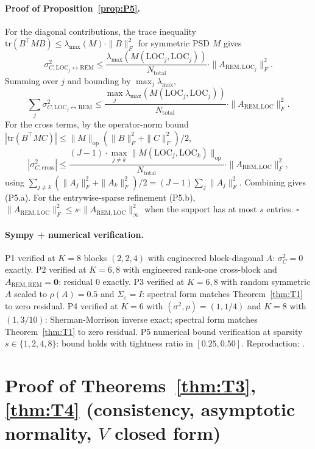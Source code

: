 \documentclass[11pt,letterpaper]{article}
\theoremstyle{remark}
\newcommand{\REM}{\mathrm{REM}}
\newcommand{\LOC}{\mathrm{LOC}}
\newcommand{\Sigmae}{\Sigma_\varepsilon}
\newcommand{\Ntot}{N_{\mathrm{total}}}
\newcommand{\sigC}{\sigma^2_C}
\newcommand{\trace}{\mathrm{tr}}
\begin{document}
\paragraph{Proof of Proposition~\ref{prop:P5}.} For the diagonal contributions, the trace inequality $\trace(B^\top M B) \le \lambda_{\max}(M) \cdot \|B\|_F^2$ for symmetric PSD $M$ gives
\begin{equation*}
\sigma^2_{C, \LOC_j \leftrightarrow \REM} \le \frac{\lambda_{\max}(M(\LOC_j, \LOC_j))}{\Ntot} \cdot \|A_{\REM, \LOC_j}\|_F^2.
\end{equation*}
Summing over $j$ and bounding by $\max_j \lambda_{\max}$,
\begin{equation*}
\sum_j \sigma^2_{C, \LOC_j \leftrightarrow \REM} \le \frac{\max_j \lambda_{\max}(M(\LOC_j, \LOC_j))}{\Ntot} \cdot \|A_{\REM, \LOC}\|_F^2.
\end{equation*}
For the cross terms, by the operator-norm bound $|\trace(B^\top M C)| \le \|M\|_{\mathrm{op}} (\|B\|_F^2 + \|C\|_F^2)/2$,
\begin{equation*}
|\sigma^2_{C, \mathrm{cross}}| \le \frac{(J - 1) \cdot \max_{j \ne k} \|M(\LOC_j, \LOC_k)\|_{\mathrm{op}}}{\Ntot} \cdot \|A_{\REM, \LOC}\|_F^2,
\end{equation*}
using $\sum_{j \ne k} (\|A_j\|_F^2 + \|A_k\|_F^2)/2 = (J - 1) \sum_j \|A_j\|_F^2$. Combining gives (P5.a). For the entrywise-sparse refinement (P5.b), $\|A_{\REM, \LOC}\|_F^2 \le s \cdot \|A_{\REM, \LOC}\|_\infty^2$ when the support has at most $s$ entries. $\square$

\paragraph{Sympy + numerical verification.} P1 verified at $K = 8$ blocks $(2, 2, 4)$ with engineered block-diagonal $A$: $\sigC = 0$ exactly. P2 verified at $K = 6, 8$ with engineered rank-one cross-block and $A_{\REM, \REM} = \mathbf{0}$: residual $0$ exactly. P3 verified at $K = 6, 8$ with random symmetric $A$ scaled to $\rho(A) = 0.5$ and $\Sigmae = I$: spectral form matches Theorem~\ref{thm:T1} to zero residual. P4 verified at $K = 6$ with $(\sigma^2, \rho) = (1, 1/4)$ and $K = 8$ with $(1, 3/10)$: Sherman-Morrison inverse exact; spectral form matches Theorem~\ref{thm:T1} to zero residual. P5 numerical bound verification at sparsity $s \in \{1, 2, 4, 8\}$: bound holds with tightness ratio in $[0.25, 0.50]$. Reproduction: .

\section{\texorpdfstring{Proof of Theorems~\ref{thm:T3}, \ref{thm:T4} (consistency, asymptotic normality, $V$ closed form)}{Proof of Theorems 3, 4 (consistency, asymptotic normality, V closed form)}}\label{app:D}
\end{document}
